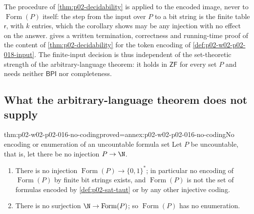 The procedure of \cref{thm:p02-decidability} is applied to the encoded image,
never to \(\operatorname{Form}(P)\) itself: the step from the input over
\(P\) to a bit string is the finite table \(\mathsf r\), with \(k\) entries,
which the corollary shows may be any injection with no effect on the answer.
 gives a written termination, correctness
and running-time proof of the content of \cref{thm:p02-decidability} for the
token encoding of \cref{def:p02-w02-p02-018-input}.  The finite-input
decision is thus independent of the set-theoretic strength of the
arbitrary-language theorem: it holds in \(\mathsf{ZF}\) for every set \(P\)
and needs neither \(\mathsf{BPI}\) nor completeness.

\subsection{What the arbitrary-language theorem does not supply}
\label{sec:p02-w02-p02-016-limits}

\begin{hbtheorem}{thm:p02-w02-p02-016-no-coding}{proved=annex:p02-w02-p02-016-no-coding}{No encoding or enumeration of an uncountable formula set}
Let \(P\) be uncountable, that is, let there be no injection \(P\to\N\).
\begin{enumerate}
\item There is no injection \(\operatorname{Form}(P)\to\{0,1\}^*\); in
      particular no encoding of \(\operatorname{Form}(P)\) by finite bit
      strings exists, and \(\operatorname{Form}(P)\) is not the set of formulas
      encoded by \cref{def:p02-sat-taut} or by any other injective coding.
\item There is no surjection \(\N\to\operatorname{Form}(P)\); so
      \(\operatorname{Form}(P)\) has no enumeration.
\end{enumerate}
\end{hbtheorem}

